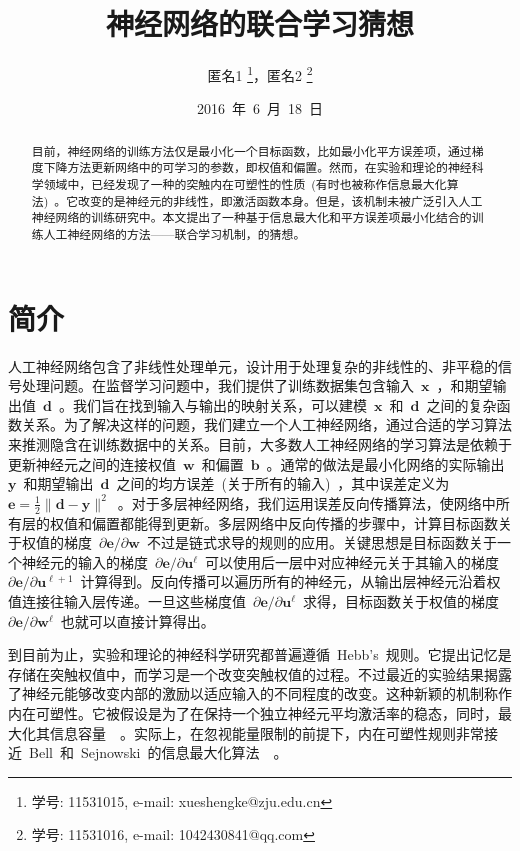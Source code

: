 \documentclass[UTF8,a4paper,12pt]{ctexart}
\title{神经网络的联合学习猜想}
\author{ 匿名1 \thanks{学号: 11531015, e-mail: xueshengke@zju.edu.cn}，匿名2 \thanks{学号: 11531016, e-mail: 1042430841@qq.com} }
\date{2016~年~6~月~18~日}
\numberwithin{equation}{section}
\numberwithin{figure}{section}
\numberwithin{table}{section}
\renewcommand{\bold}[1]{~$\bm{#1}$~}
\begin{document}
	\maketitle
\begin{abstract}
目前，神经网络的训练方法仅是最小化一个目标函数，比如最小化平方误差项，通过梯度下降方法更新网络中的可学习的参数，即权值和偏置。然而，在实验和理论的神经科学领域中，已经发现了一种的突触内在可塑性的性质~(有时也被称作信息最大化算法)~。它改变的是神经元的非线性，即激活函数本身。但是，该机制未被广泛引入人工神经网络的训练研究中。本文提出了一种基于信息最大化和平方误差项最小化结合的训练人工神经网络的方法——联合学习机制，的猜想。
\end{abstract}

\section{简介}
人工神经网络包含了非线性处理单元，设计用于处理复杂的非线性的、非平稳的信号处理问题。在监督学习问题中，我们提供了训练数据集包含输入\bold{x}，和期望输出值\bold{d}。我们旨在找到输入与输出的映射关系，可以建模\bold{x}和\bold{d}之间的复杂函数关系。为了解决这样的问题，我们建立一个人工神经网络，通过合适的学习算法来推测隐含在训练数据中的关系。目前，大多数人工神经网络的学习算法是依赖于更新神经元之间的连接权值\bold{w}和偏置\bold{b}。通常的做法是最小化网络的实际输出\bold{y}和期望输出\bold{d}之间的均方误差~(关于所有的输入)~，其中误差定义为~$\bm{e}=\frac{1}{2}\parallel \bm{d} - \bm{y} \parallel^2$~。对于多层神经网络，我们运用误差反向传播算法，使网络中所有层的权值和偏置都能得到更新。多层网络中反向传播的步骤中，计算目标函数关于权值的梯度~$\partial \bm{e}/\partial \bm{w}$~不过是链式求导的规则的应用。关键思想是目标函数关于一个神经元的输入的梯度~$\partial \bm{e}/\partial \bm{u}^\ell$~可以使用后一层中对应神经元关于其输入的梯度~$\partial \bm{e}/\partial \bm{u}^{\ell+1}$~计算得到。反向传播可以遍历所有的神经元，从输出层神经元沿着权值连接往输入层传递。一旦这些梯度值~$\partial \bm{e}/\partial \bm{u}^\ell$~求得，目标函数关于权值的梯度~$\partial \bm{e}/\partial \bm{w}^\ell$~也就可以直接计算得出。

到目前为止，实验和理论的神经科学研究都普遍遵循~Hebb's~规则。它提出记忆是存储在突触权值中，而学习是一个改变突触权值的过程。不过最近的实验结果揭露了神经元能够改变内部的激励以适应输入的不同程度的改变。这种新颖的机制称作内在可塑性。它被假设是为了在保持一个独立神经元平均激活率的稳态，同时，最大化其信息容量~\cite{stemmler1999voltage}\cite{triesch2005gradient}\cite{triesch2007synergies}~。实际上，在忽视能量限制的前提下，内在可塑性规则非常接近~Bell~和~Sejnowski~的信息最大化算法~\cite{bell1995information}~。
\end{document}
